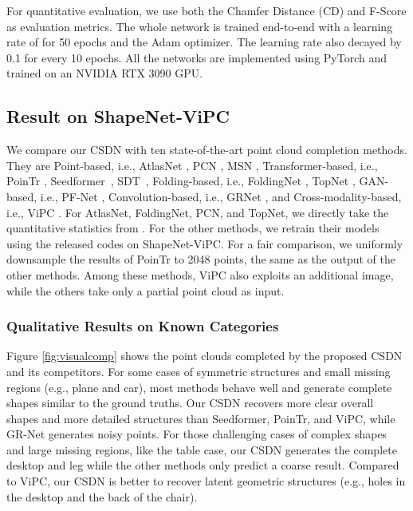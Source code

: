 For quantitative evaluation, we use both the Chamfer Distance (CD) and F-Score as evaluation metrics. The whole network is trained end-to-end with a learning rate of  for 50 epochs and the Adam optimizer. The learning rate also decayed by 0.1 for every 10 epochs. All the networks are implemented using PyTorch and trained on an NVIDIA RTX 3090 GPU.

\subsection{Result on ShapeNet-ViPC}
\label{subsec:comparison}
We compare our CSDN with ten state-of-the-art point cloud completion methods. They are Point-based, i.e., AtlasNet \cite{groueix2018papier}, PCN \cite{yuan2018pcn}, MSN \cite{liu2020morphing}, Transformer-based, i.e., PoinTr \cite{yu2021pointr}, Seedformer~\cite{zhou2022seedformer}, SDT~\cite{zhang2022point}, Folding-based, i.e., FoldingNet \cite{yang2018foldingnet}, TopNet \cite{tchapmi2019topnet}, GAN-based, i.e., PF-Net \cite{huang2020pf},  Convolution-based, i.e., GRNet \cite{xie2020grnet}, and Cross-modality-based, i.e., ViPC \cite{zhang2021view}. For AtlasNet, FoldingNet, PCN, and TopNet, we directly take the quantitative statistics from \cite{zhang2021view}. For the other methods, we retrain their models using the released codes on ShapeNet-ViPC. 
For a fair comparison, we uniformly downsample the results of PoinTr to 2048 points, the same as the output of the other methods. Among these methods, ViPC also exploits an additional image, while the others take only a partial point cloud as input.

\subsubsection{Qualitative Results on Known Categories}
Figure \ref{fig:visualcomp} shows the point clouds completed by the proposed CSDN and its competitors. 
For some cases of symmetric structures and small missing regions (e.g., plane and car), most methods behave well and generate complete shapes similar to the ground truths. Our CSDN recovers more clear overall shapes and more detailed structures than Seedformer, PoinTr, and ViPC, while GR-Net generates noisy points. For those challenging cases of complex shapes and large missing regions, like the table case, our CSDN generates the complete desktop and leg while the other methods only predict a coarse result. Compared to ViPC, 
our CSDN is better to recover latent geometric structures (e.g., holes in the desktop and the back of the chair).


